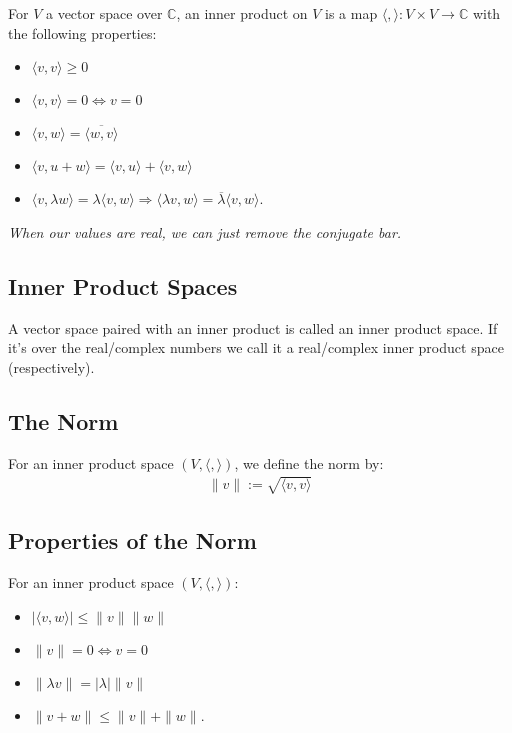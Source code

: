 \documentclass[a4paper, 12pt, twoside]{article}
\begin{document}
For $V$ a vector space over $\mathbb{C}$, an inner product on
$V$ is a map $\langle,\rangle : V \times V \to \mathbb{C}$ with
the following properties:
\begin{itemize}
  \item $\langle v, v \rangle \geq 0$
  \item $\langle v, v \rangle = 0 \Leftrightarrow v = 0$
  \item $\langle v, w \rangle = \overline{\langle w, v \rangle}$
  \item $\langle v, u + w \rangle 
    = \langle v, u \rangle + \langle v, w \rangle$
  \item $\langle v, \lambda w \rangle = \lambda \langle v, w \rangle
    \Rightarrow \langle \lambda v, w \rangle = \overline{\lambda}\langle v, w \rangle$.
\end{itemize}

\textit{When our values are real, we can just remove the conjugate
bar.}

\subsection{Inner Product Spaces}

A vector space paired with an inner product is called an inner
product space. If it's over the real/complex numbers we call
it a real/complex inner product space (respectively).

\subsection{The Norm}

For an inner product space $(V, \langle , \rangle)$, we define the
norm by:
\begin{align*}
  \|v\| := \sqrt{\langle v,v \rangle}
\end{align*}

\subsection{Properties of the Norm}

For an inner product space $(V, \langle , \rangle)$:

\begin{itemize}
  \item $|\langle v, w \rangle| \leq \|v\|\|w\|$
  \item $\|v\| = 0 \Leftrightarrow v = 0$
  \item $\|\lambda v\| = |\lambda|\|v\|$
  \item $\|v + w\| \leq \|v\| + \|w\|$.
\end{itemize}
\end{document}
